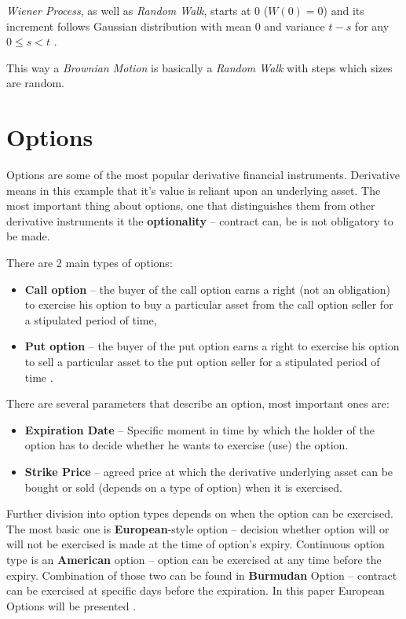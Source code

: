         \textit{Wiener Process}, as well as \textit{Random Walk}, starts at 0 (\( W(0) = 0 \)) and its increment follows Gaussian distribution with mean \(0\) and variance \(t-s\) for any \(0\leq s < t \) \cite{wienerProcess}.
        
        This way a \textit{Brownian Motion} is basically a \textit{Random Walk} with steps which sizes are random.
        
\section{Options}
    Options are some of the most popular derivative financial instruments. Derivative means in this example that it's value is reliant upon an underlying asset. The most important thing about options, one that distinguishes them from other derivative instruments it the \textbf{optionality} -- contract can, be is not obligatory to be made.
    
    There are 2 main types of options:
    \begin{itemize}
        \item \textbf{Call option} -- the buyer of the call option earns a right (not an obligation) to exercise his option to buy a particular asset from the call option seller for a stipulated period of time,
        \item \textbf{Put option} -- the buyer of the put option earns a right to exercise his option to sell a particular asset to the put option seller for a stipulated period of time \cite{Call_Put_Option_Definition}.
    \end{itemize}
    
    There are several parameters that describe an option, most important ones are:
    \begin{itemize}
        \item \textbf{Expiration Date} -- Specific moment in time by which the holder of the option has to decide whether he wants to exercise (use) the option.
        \item \textbf{Strike Price} -- agreed price at which the derivative underlying asset can be bought or sold (depends on a type of option) when it is exercised.
    \end{itemize}
    
    Further division into option types depends on when the option can be exercised. The most basic one is \textbf{European}-style option -- decision whether option will or will not be exercised is made at the time of option's expiry. Continuous option type is an \textbf{American} option -- option can be exercised at any time before the expiry. Combination of those two can be found in \textbf{Burmudan} Option -- contract can be exercised at specific days before the expiration. In this paper European Options will be presented \cite{Option_Types}.

